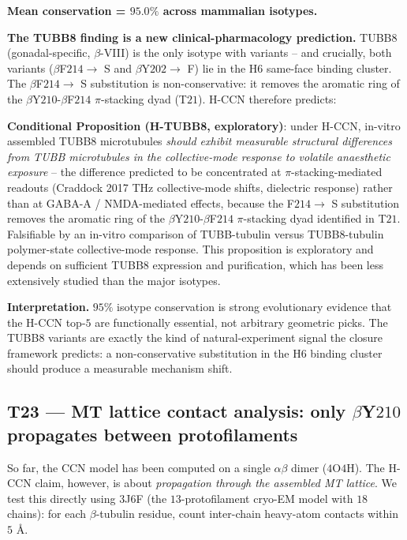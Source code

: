 \documentclass[11pt,a4paper]{article}
\begin{document}
\textbf{Mean conservation = $95.0\%$ across mammalian isotypes.}

\textbf{The TUBB8 finding is a new clinical-pharmacology prediction.}
TUBB8 (gonadal-specific, $\beta$-VIII) is the only isotype with
variants -- and crucially, both variants ($\beta$F$214 \to$ S and
$\beta$Y$202 \to$ F) lie in the H$6$ same-face binding cluster.
The $\beta$F$214 \to$ S substitution is non-conservative: it removes
the aromatic ring of the $\beta$Y$210$-$\beta$F$214$ $\pi$-stacking
dyad (T$21$). H-CCN therefore predicts:

\textbf{Conditional Proposition (H-TUBB8, exploratory)}: under H-CCN,
in-vitro assembled TUBB8 microtubules \emph{should exhibit measurable
structural differences from TUBB microtubules in the collective-mode
response to volatile anaesthetic exposure} -- the difference predicted
to be concentrated at $\pi$-stacking-mediated readouts (Craddock 2017
THz collective-mode shifts, dielectric response) rather than at
GABA-A / NMDA-mediated effects, because the F$214 \to$ S substitution
removes the aromatic ring of the $\beta$Y$210$-$\beta$F$214$ $\pi$-stacking
dyad identified in T$21$. Falsifiable by an in-vitro comparison of
TUBB-tubulin versus TUBB8-tubulin polymer-state collective-mode
response. This proposition is exploratory and depends on
sufficient TUBB8 expression and purification, which has been less
extensively studied than the major isotypes.

\textbf{Interpretation.} $95\%$ isotype conservation is strong
evolutionary evidence that the H-CCN top-$5$ are functionally
essential, not arbitrary geometric picks. The TUBB8 variants are
exactly the kind of natural-experiment signal the closure framework
predicts: a non-conservative substitution in the H$6$ binding cluster
should produce a measurable mechanism shift.

\subsection{\textsf{T23} --- MT lattice contact analysis: only $\beta$Y$210$ propagates between protofilaments}\label{ssec:t23}

So far, the CCN model has been computed on a single $\alpha\beta$
dimer ($4$O$4$H). The H-CCN claim, however, is about
\emph{propagation through the assembled MT lattice}. We test this
directly using $3$J$6$F (the $13$-protofilament cryo-EM model with
$18$ chains): for each $\beta$-tubulin residue, count inter-chain
heavy-atom contacts within $5$ \AA.
\end{document}

